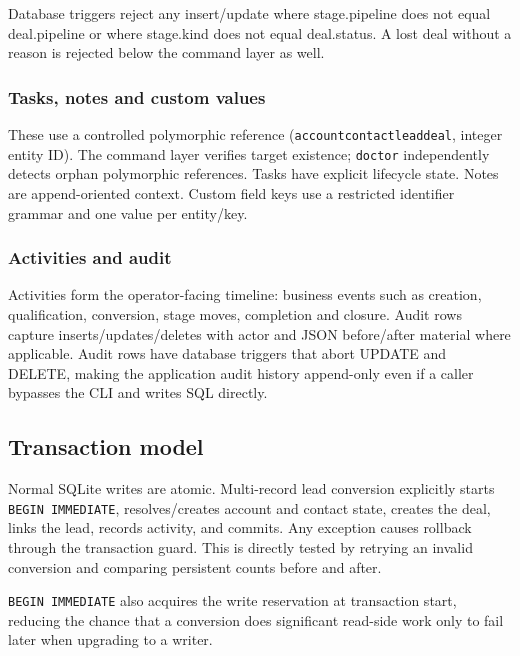 \documentclass[
]{article}
\begin{document}
Database triggers reject any insert/update where stage.pipeline does not
equal deal.pipeline or where stage.kind does not equal deal.status. A
lost deal without a reason is rejected below the command layer as well.

\subsubsection{Tasks, notes and custom
values}\label{tasks-notes-and-custom-values}

These use a controlled polymorphic reference
(\texttt{account\textbar{}contact\textbar{}lead\textbar{}deal}, integer
entity ID). The command layer verifies target existence; \texttt{doctor}
independently detects orphan polymorphic references. Tasks have explicit
lifecycle state. Notes are append-oriented context. Custom field keys
use a restricted identifier grammar and one value per entity/key.

\subsubsection{Activities and audit}\label{activities-and-audit}

Activities form the operator-facing timeline: business events such as
creation, qualification, conversion, stage moves, completion and
closure. Audit rows capture inserts/updates/deletes with actor and JSON
before/after material where applicable. Audit rows have database
triggers that abort UPDATE and DELETE, making the application audit
history append-only even if a caller bypasses the CLI and writes SQL
directly.

\subsection{Transaction model}\label{transaction-model}

Normal SQLite writes are atomic. Multi-record lead conversion explicitly
starts \texttt{BEGIN\ IMMEDIATE}, resolves/creates account and contact
state, creates the deal, links the lead, records activity, and commits.
Any exception causes rollback through the transaction guard. This is
directly tested by retrying an invalid conversion and comparing
persistent counts before and after.

\texttt{BEGIN\ IMMEDIATE} also acquires the write reservation at
transaction start, reducing the chance that a conversion does
significant read-side work only to fail later when upgrading to a
writer.
\end{document}
